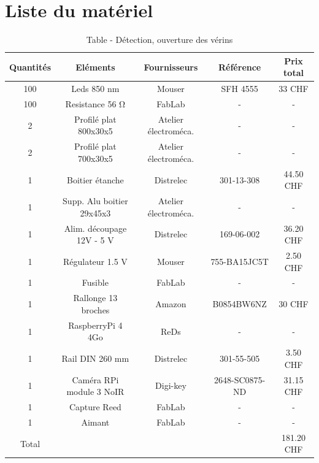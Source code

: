 \documentclass[
    iai, %
    eai, %
]{heig-tb}
\begin{document}
\chapter{Liste du matériel}
\begin{table}[H]
    \begin{center}
        \caption{Table - Détection, ouverture des vérins}
        \begin{tabular}{|c|c|c|c|c|}
            Quantités & Eléments                  & Fournisseurs         & Référence      & Prix total \\ \hline
            100       & Leds 850 nm               & Mouser               & SFH 4555       & 33 CHF     \\
            100       & Resistance 56 \si{\ohm}   & FabLab               & -              & -          \\
            2         & Profilé plat 800x30x5     & Atelier électroméca. & -              & -          \\
            2         & Profilé plat 700x30x5     & Atelier électroméca. & -              & -          \\
            1         & Boitier étanche           & Distrelec            & 301-13-308     & 44.50 CHF  \\
            1         & Supp. Alu boitier 29x45x3 & Atelier électroméca. & -              & -          \\
            1         & Alim. découpage 12V - 5 V & Distrelec            & 169-06-002     & 36.20 CHF  \\
            1         & Régulateur 1.5 V          & Mouser               & 755-BA15JC5T   & 2.50 CHF   \\
            1         & Fusible                   & FabLab               & -              & -          \\
            1         & Rallonge 13 broches       & Amazon               & B0854BW6NZ     & 30 CHF     \\
            1         & RaspberryPi 4 4Go         & ReDs                 & -              & -          \\
            1         & Rail DIN 260 mm           & Distrelec            & 301-55-505     & 3.50 CHF   \\
            1         & Caméra RPi module 3 NoIR  & Digi-key             & 2648-SC0875-ND & 31.15 CHF  \\
            1         & Capture Reed              & FabLab               & -              & -          \\
            1         & Aimant                    & FabLab               & -              & -          \\ \hline
            Total     &                           &                      &                & 181.20 CHF \\
        \end{tabular}
    \end{center}
\end{table}
\end{document}
